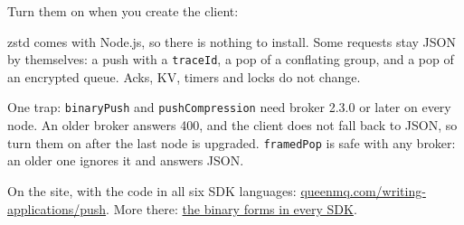 Turn them on when you create the client:


zstd comes with Node.js, so there is nothing to install. Some requests stay JSON by themselves: a
push with a \texttt{traceId}, a pop of a conflating group, and a pop of an encrypted queue. Acks,
KV, timers and locks do not change.


One trap: \texttt{binaryPush} and \texttt{pushCompression} need broker 2.3.0 or later on every node.
An older broker answers 400, and the client does not fall back to JSON, so turn them on after the
last node is upgraded. \texttt{framedPop} is safe with any broker: an older one ignores it and
answers JSON.

On the site, with the code in all six SDK languages: \href{https://queenmq.com/writing-applications/push/}{queenmq.com/writing-applications/push}. More there: \href{https://queenmq.com/writing-applications/clients/}{the binary forms in every SDK}.
